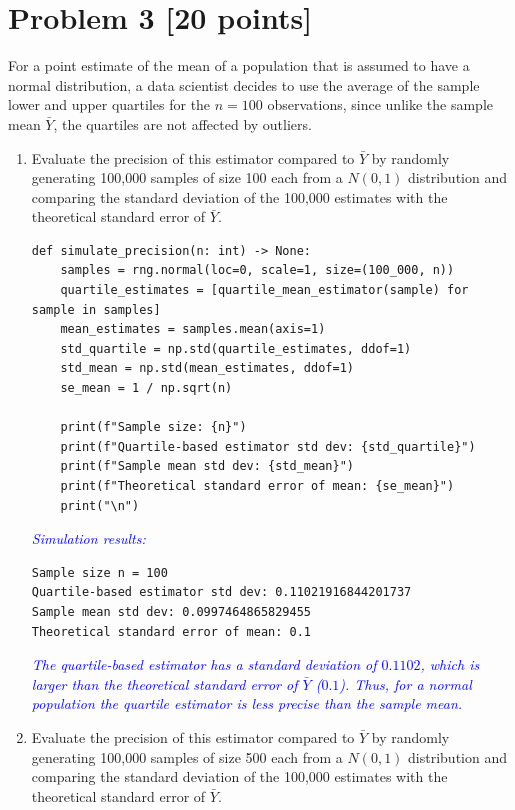 \documentclass[12pt]{article}
\begin{document}
\section*{Problem 3 [20 points]}

For a point estimate of the mean of a population that is assumed to have a normal distribution, a data scientist decides to use the average of the sample lower and upper quartiles for the $n=100$ observations, since unlike the sample mean $\bar{Y}$, the quartiles are not affected by outliers.

\begin{enumerate}

\item[(a)] Evaluate the precision of this estimator compared to $\bar{Y}$ by randomly generating 100,000 samples of size 100 each from a $N(0,1)$ distribution and comparing the standard deviation of the 100,000 estimates with the theoretical standard error of $\bar{Y}$.

\begin{lstlisting}
def simulate_precision(n: int) -> None:
    samples = rng.normal(loc=0, scale=1, size=(100_000, n))
    quartile_estimates = [quartile_mean_estimator(sample) for sample in samples]
    mean_estimates = samples.mean(axis=1)
    std_quartile = np.std(quartile_estimates, ddof=1)
    std_mean = np.std(mean_estimates, ddof=1)
    se_mean = 1 / np.sqrt(n)

    print(f"Sample size: {n}")
    print(f"Quartile-based estimator std dev: {std_quartile}")
    print(f"Sample mean std dev: {std_mean}")
    print(f"Theoretical standard error of mean: {se_mean}")
    print("\n")
\end{lstlisting}

\textit{\textcolor{blue}{Simulation results:}}

\begin{verbatim}
Sample size n = 100
Quartile-based estimator std dev: 0.11021916844201737
Sample mean std dev: 0.0997464865829455
Theoretical standard error of mean: 0.1
\end{verbatim}

\textit{\textcolor{blue}{The quartile-based estimator has a standard deviation of $0.1102$, which is larger than the theoretical standard error of $\bar{Y}$ ($0.1$). Thus, for a normal population the quartile estimator is less precise than the sample mean.}}

\item[(b)] Evaluate the precision of this estimator compared to $\bar{Y}$ by randomly generating 100,000 samples of size 500 each from a $N(0,1)$ distribution and comparing the standard deviation of the 100,000 estimates with the theoretical standard error of $\bar{Y}$.


\end{enumerate}
\end{document}
